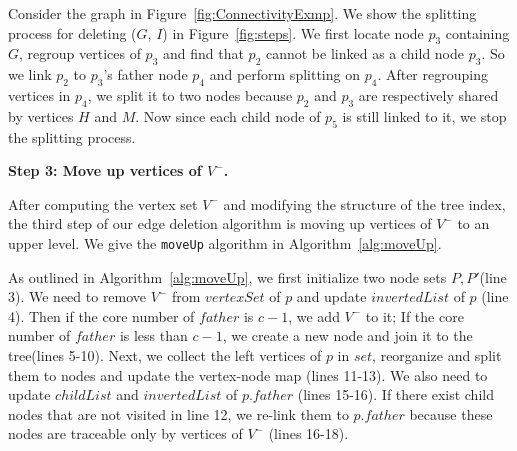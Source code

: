 \begin{example}
\label{em:steps}
Consider the graph in Figure~\ref{fig:ConnectivityExmp}.
We show the splitting process for deleting ($G$, $I$) in Figure~\ref{fig:steps}.
We first locate node $p_3$ containing $G$, regroup vertices of $p_3$ and find that $p_2$ cannot be linked as a child node $p_3$. So we link $p_2$ to $p_3$'s father node $p_4$ and perform splitting on $p_4$.
After regrouping vertices in $p_4$, we split it to two nodes because $p_2$ and $p_3$ are respectively shared by vertices $H$ and $M$.
Now since each child node of $p_5$ is still linked to it,
we stop the splitting process.
\end{example}


\textbf{Step 3: Move up vertices of $V^-$.}

After computing the vertex set $V^-$ and modifying the structure of the tree index, the third step of our edge deletion algorithm is moving up vertices of $V^-$ to an upper level. We give the {\tt moveUp} algorithm in Algorithm~\ref{alg:moveUp}.

As outlined in Algorithm~\ref{alg:moveUp}, we first initialize two node sets $P,P'$(line 3). We need to remove $V^-$ from $vertexSet$ of $p$ and update $invertedList$ of $p$ (line 4). Then if the core number of $father$ is $c-1$, we add $V^-$ to it; If the core number of $father$ is less than $c-1$, we create a new node and join it to the tree(lines 5-10). Next, we collect the left vertices of $p$ in $set$, reorganize and split them to nodes and update the vertex-node map (lines 11-13). We also need to update $childList$ and $invertedList$ of $p.father$ (lines 15-16). If there exist child nodes that are not visited in line 12, we re-link them to $p.father$ because these nodes are traceable only by vertices of $V^-$ (lines 16-18).




